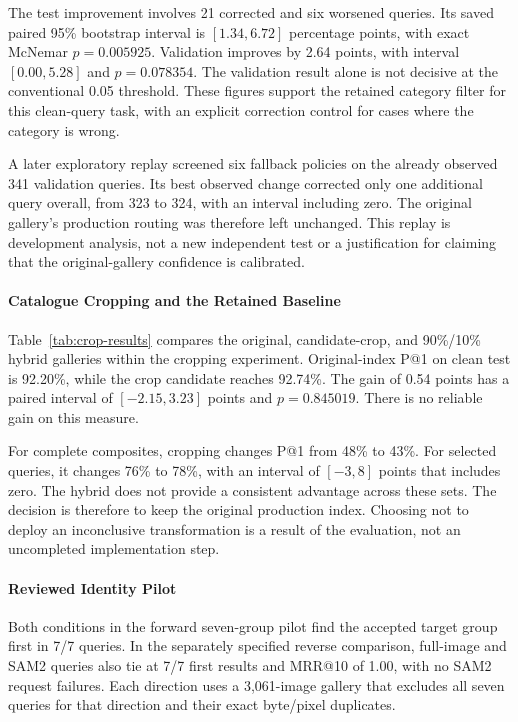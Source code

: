 The test improvement involves 21 corrected and six worsened queries. Its saved
paired 95\% bootstrap interval is $[1.34,6.72]$ percentage points, with exact
McNemar $p=0.005925$. Validation improves by 2.64 points, with interval
$[0.00,5.28]$ and $p=0.078354$. The validation result alone is not decisive at
the conventional 0.05 threshold. These figures support the retained category
filter for this clean-query task, with an explicit correction control for cases
where the category is wrong.

A later exploratory replay screened six fallback policies on the already observed
341 validation queries. Its best observed change corrected only one additional
query overall, from 323 to 324, with an interval including zero. The original
gallery's production routing was therefore left unchanged. This replay is
development analysis, not a new independent test or a justification for claiming
that the original-gallery confidence is calibrated.

\paragraph{Catalogue Cropping and the Retained Baseline}
Table~\ref{tab:crop-results} compares the original, candidate-crop, and
90\%/10\% hybrid galleries within the cropping experiment. Original-index P@1
on clean test is 92.20\%, while the crop candidate reaches 92.74\%. The gain of
0.54 points has a paired interval of $[-2.15,3.23]$ points and $p=0.845019$.
There is no reliable gain on this measure.

\begin{table}[H]\centering
\caption{Separate cropping experiment: category Top-1 within each query set}
\label{tab:crop-results}
\begin{ReportTable}\end{ReportTable}
\end{table}

For complete composites, cropping changes P@1 from 48\% to 43\%. For selected
queries, it changes 76\% to 78\%, with an interval of $[-3,8]$ points that
includes zero. The hybrid does not provide a consistent advantage across these
sets. The decision is therefore to keep the original production index. Choosing
not to deploy an inconclusive transformation is a result of the evaluation,
not an uncompleted implementation step.

\paragraph{Reviewed Identity Pilot}
Both conditions in the forward seven-group pilot find the accepted target group
first in 7/7 queries. In the separately specified reverse comparison, full-image
and SAM2 queries also tie at 7/7 first results and MRR@10 of 1.00, with no SAM2
request failures. Each direction uses a 3,061-image gallery that excludes all
seven queries for that direction and their exact byte/pixel duplicates.

